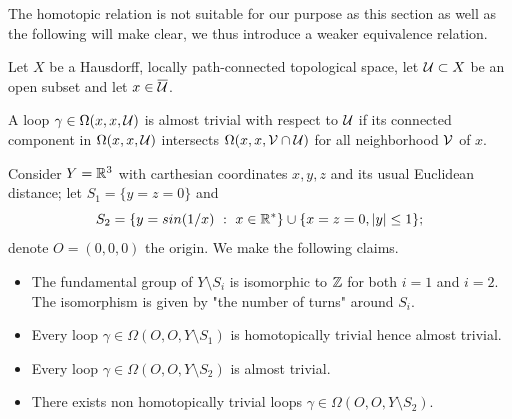 The homotopic relation is not suitable for our purpose as this section as well as the following will make clear, we thus introduce a weaker equivalence relation.

\begin{defi} Let $X$ be a Hausdorff, locally path-connected topological space, let $\mathcal{U}\subset X$ be an open subset and let $x\in \overline {\mathcal{U}}$.

A loop $\gamma\in \Omega(x,x,\mathcal{U})$ is  almost trivial with respect to $\mathcal{U}$ if its connected component in $\Omega(x,x,\mathcal{U})$ intersects $\Omega(x,x,\mathcal V\cap \mathcal{U})$ for all neighborhood $\mathcal V$ of $x$. 
\end{defi}
\begin{ex}
 Consider $Y = \mathbb R^3$ with carthesian coordinates $x,y,z$ and its usual Euclidean distance; let  $S_1= \{y=z=0\}$ and $$S_2=\{y=sin(1/x) ~:~ x\in \mathbb R^*\}\cup \{x=z=0, |y|\leq 1 \};$$ denote $O=(0,0,0)$ the origin. 
 We make the following claims.
 \begin{itemize}
  \item  The fundamental group of $Y\setminus S_i$ is isomorphic to $\mathbb{Z}$ for both $i=1$ and $i=2$. The isomorphism is given by "the number of turns" around $S_i$. 
  \item Every loop  $\gamma\in \Omega(O,O,Y\setminus S_1)$ is homotopically trivial hence almost trivial.
  \item Every loop  $\gamma\in \Omega(O,O,Y\setminus S_2)$ is almost trivial. 
  \item There exists non homotopically trivial loops $\gamma\in \Omega(O,O,Y\setminus S_2)$.
 \end{itemize}
\end{ex}
